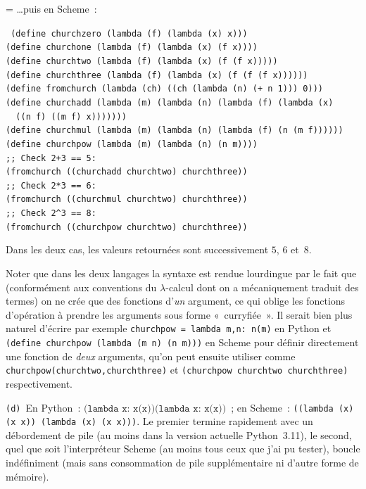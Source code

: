 \documentclass[12pt,a4paper]{article}
\theoremstyle{definition}
\newif\ifcorrige
\newenvironment{corrige}%
{\ifcorrige\relax\else\setbox0=\vbox\bgroup\fi%
\smallbreak\footnotesize\noindent{\underbar{\textit{Corrigé.}}\quad}}
{{\hbox{}\nobreak\hfill\checkmark}%
\ifcorrige\relax\else\egroup\fi\par}
\begin{document}
\begin{corrige}
\noindent …puis en Scheme :

\noindent\texttt{%
(define churchzero (lambda (f) (lambda (x) x)))\\
(define churchone (lambda (f) (lambda (x) (f x))))\\
(define churchtwo (lambda (f) (lambda (x) (f (f x)))))\\
(define churchthree (lambda (f) (lambda (x) (f (f (f x))))))\\
(define fromchurch (lambda (ch) ((ch (lambda (n) (+ n 1))) 0)))\\
(define churchadd (lambda (m) (lambda (n) (lambda (f) (lambda (x)\\
\ \ ((n f) ((m f) x)))))))\\
(define churchmul (lambda (m) (lambda (n) (lambda (f) (n (m f))))))\\
(define churchpow (lambda (m) (lambda (n) (n m))))\\
;; Check 2+3 == 5:\\
(fromchurch ((churchadd churchtwo) churchthree))\\
;; Check 2*3 == 6:\\
(fromchurch ((churchmul churchtwo) churchthree))\\
;; Check 2\textasciicircum 3 == 8:\\
(fromchurch ((churchpow churchtwo) churchthree))
}

Dans les deux cas, les valeurs retournées sont successivement $5$, $6$
et $8$.

Noter que dans les deux langages la syntaxe est rendue lourdingue par
le fait que (conformément aux conventions du $\lambda$-calcul dont on
a mécaniquement traduit des termes) on ne crée que des fonctions
d'\emph{un} argument, ce qui oblige les fonctions d'opération à
prendre les arguments sous forme « curryfiée ».  Il serait bien plus
naturel d'écrire par exemple \texttt{churchpow = lambda m,n: n(m)} en
Python et \texttt{(define churchpow (lambda (m n) (n m)))} en Scheme
pour définir directement une fonction de \emph{deux} arguments, qu'on
peut ensuite utiliser comme \texttt{churchpow(churchtwo,churchthree)}
et \texttt{(churchpow churchtwo churchthree)} respectivement.

\texttt{(d)} En Python : $\texttt{(lambda x: x(x))(lambda x: x(x))}$ ;
en Scheme : \texttt{((lambda (x) (x x)) (lambda (x) (x x)))}.  Le
premier termine rapidement avec un débordement de pile (au moins dans
la version actuelle Python 3.11), le second, quel que soit
l'interpréteur Scheme (au moins tous ceux que j'ai pu tester), boucle
indéfiniment (mais sans consommation de pile supplémentaire ni d'autre
forme de mémoire).


\end{corrige}
\end{document}
